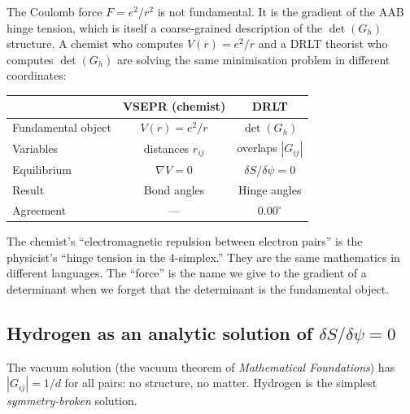 \begin{remark}
The Coulomb force $F = e^2/r^2$ is not fundamental.  It is the gradient of the AAB hinge tension, which is itself a coarse-grained description of the $\det(G_h)$ structure.  A chemist who computes $V(r) = e^2/r$ and a DRLT theorist who computes $\det(G_h)$ are solving the same minimisation problem in different coordinates:
\begin{center}
\begin{tabular}{lcc}
\hline
& VSEPR (chemist) & DRLT \\
\hline
Fundamental object & $V(r) = e^2/r$ & $\det(G_h)$ \\
Variables & distances $r_{ij}$ & overlaps $|G_{ij}|$ \\
Equilibrium & $\nabla V = 0$ & $\delta S / \delta\psi = 0$ \\
Result & Bond angles & Hinge angles \\
Agreement & --- & $0.00^\circ$ \\
\hline
\end{tabular}
\end{center}
The chemist's ``electromagnetic repulsion between electron pairs'' is the physicist's ``hinge tension in the 4-simplex.''  They are the same mathematics in different languages.  The ``force'' is the name we give to the gradient of a determinant when we forget that the determinant is the fundamental object.
\end{remark}

\subsection{Hydrogen as an analytic solution of $\delta S/\delta\psi = 0$}
\label{sec:hydrogen_analytic}

The vacuum solution (the vacuum theorem of \textit{Mathematical Foundations}) has $|G_{ij}| = 1/d$ for all pairs: no structure, no matter.  Hydrogen is the simplest \emph{symmetry-broken} solution.

